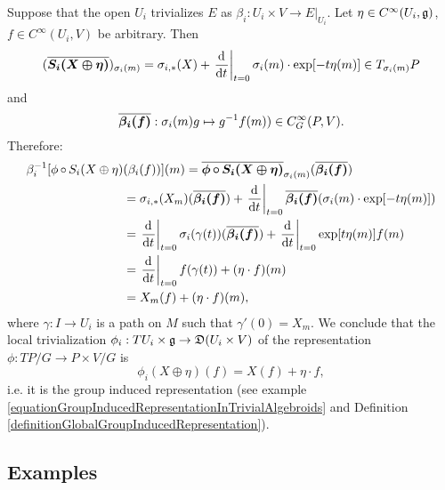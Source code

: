 \begin{example}[Local trivialization of representation of $TP/G$ on $E =$ $P \times V/G$]\label{localTrivializationOfRepresentationOfAtiyahTPGonAssociated}
\label{exampleLocalTrivializationOfGroupInducedRepresentationOfAtiyahLieAlgebroidAction}
Suppose that the open $U_i$ trivializes $E$ as $\beta_i: U_i \times V\to E|_{U_i}$. Let $\eta \in C^\infty(U_i, \mathfrak{g})$, $f \in C^\infty(U_i, V)$ be arbitrary. Then
$$(\upsect{S_i(X \oplus \eta)})_{\sigma_i(m)} = \sigma_{i, *}(X) + \der{t}[t=0]{\sigma_i(m) \cdot \exp[-t \eta(m)]} \in T_{\sigma_i(m)} P$$
and
$$\overline{\bm{\beta_i(f)}}: \sigma_i(m)g \mapsto g^{-1} f(m)) \in C^\infty_G(P, V).$$
Therefore:
\begin{align*}
    \beta_i^{-1}[\phi\comp S_i(X \oplus \eta)&(\beta_i(f))] (m)
        = \upsect{\phi \comp S_i(X \oplus \eta)}_{\sigma_i(m)} (\upsect{\beta_i(f)})\\
        &= \sigma_{i, *}(X_m)(\upsect{\beta_i(f)}) 
        + \der{t}[t = 0]{\upsect{\beta_i(f)}(\sigma_i(m) \cdot \exp[-t \eta(m)])}\\
        &= \der{t}[t = 0]{\sigma_i(\gamma(t))} (\upsect{\beta_i(f)}) + \der{t}[t=0]{\exp[t \eta(m)] f(m)}\\
        &= \der{t}[t=0]{f(\gamma(t))} + (\eta \cdot f)(m)\\
        &= X_m(f) + (\eta \cdot f)(m),
\end{align*}
where $\gamma: I \to U_i$ is a path on $M$ such that $\gamma'(0) = X_m$. We conclude that the local trivialization $\phi_i: TU_i \times \alg g \to \alg D(U_i \times V)$ of the representation $\phi: TP/G \to P \times V/G$ is
\begin{equation}\label{equationLocalRepresentationAtiyahLieAlgebroidOnAssociatedVectorBundleExpectedTrivialALgebroidRepresentationActionOfGroup}
    \phi_i(X \oplus \eta)(f) = X(f) + \eta \cdot f,
\end{equation}
i.e. it is the group induced representation (see example \ref{equationGroupInducedRepresentationInTrivialAlgebroids} and Definition \ref{definitionGlobalGroupInducedRepresentation}).
\end{example}




\subsection{Examples}
\label{chBasicSubsectionLocalDescriptionExamples}

